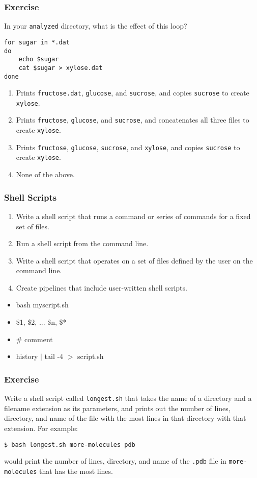\documentclass[xcolor=dvipsnames]{beamer}
\begin{document}
\begin{frame}[fragile]
\frametitle{Exercise}
In your {\tt analyzed} directory, what is the effect of this loop?

\begin{verbatim}
for sugar in *.dat
do
    echo $sugar
    cat $sugar > xylose.dat
done
\end{verbatim}
\begin{enumerate}
  \item Prints {\tt fructose.dat}, {\tt glucose}, and {\tt sucrose}, and copies {\tt sucrose} to create {\tt xylose}.
  \item Prints {\tt fructose}, {\tt glucose}, and {\tt sucrose}, and concatenates all three files to create {\tt xylose}.
  \item Prints {\tt fructose}, {\tt glucose}, {\tt sucrose}, and {\tt xylose}, and copies {\tt sucrose} to create {\tt xylose}.
  \item None of the above.
\end{enumerate}
\end{frame}


\begin{frame}
\frametitle{Shell Scripts}
\begin{enumerate}
\item Write a shell script that runs a command or series of commands for a fixed set of files.
\item Run a shell script from the command line.
\item Write a shell script that operates on a set of files defined by the user on the command line.
\item Create pipelines that include user-written shell scripts.
\end{enumerate}
\begin{multicols}{2}
\begin{itemize}
  \item bash myscript.sh
  \item \$1, \$2, ... \$n, \$*
  \item \# comment
  \item history $|$ tail -4 $>$ script.sh
\end{itemize}
\end{multicols}
\end{frame}


\begin{frame}[fragile]
\frametitle{Exercise}
Write a shell script called {\tt longest.sh} that takes the name of a directory and a filename extension as its parameters,
and prints out the number of lines,
directory,
and name of the file with the most lines in that directory with that extension.
For example:

\begin{verbatim}
$ bash longest.sh more-molecules pdb
\end{verbatim}

would print the number of lines,
directory,
and name of the {\tt .pdb} file in {\tt more-molecules} that has
the most lines.
\end{frame}
\end{document}
